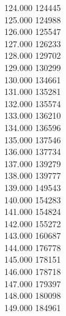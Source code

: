 { 124.000	124445 \\
 125.000	124988 \\
 126.000	125547 \\
 127.000	126233 \\
 128.000	129702 \\
 129.000	130299 \\
 130.000	134661 \\
 131.000	135281 \\
 132.000	135574 \\
 133.000	136210 \\
 134.000	136596 \\
 135.000	137546 \\
 136.000	137734 \\
 137.000	139279 \\
 138.000	139777 \\
 139.000	149543 \\
 140.000	154283 \\
 141.000	154824 \\
 142.000	155272 \\
 143.000	160687 \\
 144.000	176778 \\
 145.000	178151 \\
 146.000	178718 \\
 147.000	179397 \\
 148.000	180098 \\
 149.000	184961 \\
}
